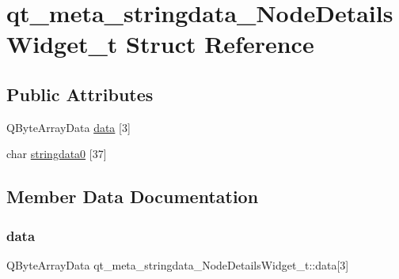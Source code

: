 \hypertarget{structqt__meta__stringdata___node_details_widget__t}{}\section{qt\+\_\+meta\+\_\+stringdata\+\_\+\+Node\+Details\+Widget\+\_\+t Struct Reference}
\label{structqt__meta__stringdata___node_details_widget__t}
\subsection*{Public Attributes}
\begin{DoxyCompactItemize}
\item 
Q\+Byte\+Array\+Data \mbox{\hyperlink{structqt__meta__stringdata___node_details_widget__t_aaffa5095037c0ea2ad2dbc2655979c8f}{data}} \mbox{[}3\mbox{]}
\item 
char \mbox{\hyperlink{structqt__meta__stringdata___node_details_widget__t_a5430f7ae75f84b0fd24e8bd9f0d609a2}{stringdata0}} \mbox{[}37\mbox{]}
\end{DoxyCompactItemize}


\subsection{Member Data Documentation}
\mbox{\label{structqt__meta__stringdata___node_details_widget__t_aaffa5095037c0ea2ad2dbc2655979c8f}} 
\subsubsection{\texorpdfstring{data}{data}}
{\footnotesize\ttfamily Q\+Byte\+Array\+Data qt\+\_\+meta\+\_\+stringdata\+\_\+\+Node\+Details\+Widget\+\_\+t\+::data\mbox{[}3\mbox{]}}

\mbox{\label{structqt__meta__stringdata___node_details_widget__t_a5430f7ae75f84b0fd24e8bd9f0d609a2}} 
